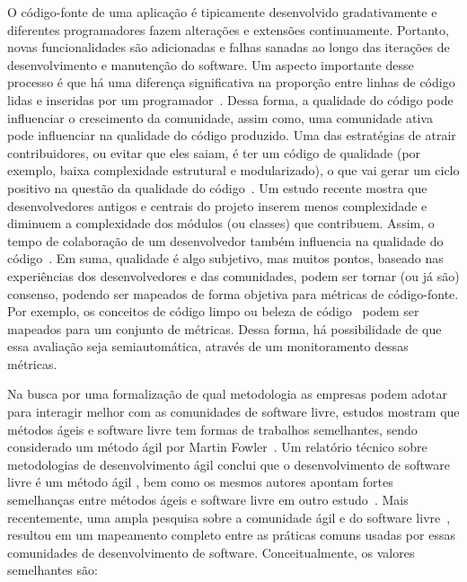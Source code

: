O código-fonte de uma aplicação é tipicamente desenvolvido gradativamente e
diferentes programadores fazem alterações e extensões continuamente.
%
Portanto, novas funcionalidades são adicionadas e falhas sanadas ao longo das iterações
de desenvolvimento e manutenção do software.
%
Um aspecto importante desse processo é que há uma diferença significativa na
proporção entre linhas de código lidas e inseridas por um
programador~\cite{martin:2008,beck:2007}.
%
Dessa forma, a qualidade do código pode influenciar o crescimento da comunidade, assim como,
uma comunidade ativa pode influenciar na qualidade do código produzido.
%
Uma das estratégias de atrair contribuidores, ou evitar que eles saiam,  é ter
um código de qualidade (por exemplo, baixa complexidade estrutural e modularizado),
o que vai gerar um ciclo positivo na questão da qualidade do
código~\cite{meirelles:2010}.
%
Um estudo recente mostra que desenvolvedores antigos e centrais do projeto
inserem menos complexidade e diminuem a complexidade dos módulos (ou classes)
que contribuem. Assim, o tempo de colaboração de um desenvolvedor também
influencia na qualidade do código~\cite{terceiro:2010}.
%
Em suma, qualidade é algo subjetivo, mas muitos pontos, baseado nas experiências
dos desenvolvedores e das comunidades, podem ser tornar (ou já são) consenso, 
podendo ser mapeados de forma objetiva para métricas de código-fonte.
%
Por exemplo, os conceitos de código limpo ou beleza de código~\cite{martin:2008,beck:2007}
podem ser mapeados para um conjunto de métricas. Dessa forma, há possibilidade de que
essa avaliação seja semiautomática, através de um monitoramento dessas métricas.

Na busca por uma formalização de qual metodologia as empresas podem adotar
para interagir melhor com as comunidades de software livre, estudos
mostram que métodos ágeis e software livre tem formas de trabalhos semelhantes,
sendo considerado um método ágil por Martin Fowler~\cite{Fowler00orig}.
%
Um relatório técnico sobre metodologias de desenvolvimento ágil conclui que
o desenvolvimento de software livre é um método ágil \cite{Warsta2002}, bem
como os mesmos autores apontam fortes semelhanças entre métodos ágeis e
software livre em outro estudo~\cite{Warsta2003}.
%
Mais recentemente, uma ampla pesquisa sobre a comunidade ágil e do software
livre~\cite{corbucci:2011}, resultou em um mapeamento completo entre as práticas 
comuns usadas por essas comunidades de desenvolvimento de software. Conceitualmente, os
valores semelhantes são:

